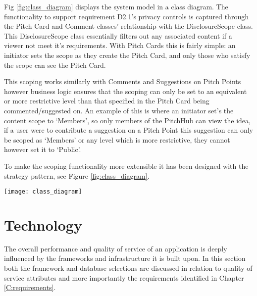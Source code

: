 Fig \ref{fig:class_diagram} displays the system model in a class diagram. The functionality to support requirement D2.1's privacy controls is captured through the Pitch Card and Comment classes' relationship with the DisclosureScope class. This DisclosureScope class essentially filters out any associated content if a viewer not meet it's requirements. With Pitch Cards this is fairly simple: an initiator sets the scope as they create the Pitch Card, and only those who satisfy the scope can see the Pitch Card.

This scoping works similarly with Comments and Suggestions on Pitch Points however business logic ensures that the  scoping can only be set to an equivalent or more restrictive level than that specified in the Pitch Card being commented/suggested on. An example of this is where an initiator set's the content scope to `Members', so only members of the PitchHub can view the idea, if a user were to contribute a suggestion on a Pitch Point this suggestion can only be scoped as `Members' or any level which is more restrictive, they cannot however set it to `Public'. 

To make the scoping functionality more extensible it has been designed with the strategy pattern, see Figure \ref{fig:class_diagram}.
 
\begin{sidewaysfigure}[ht]
    \centering
    \texttt{[image: class\_diagram]}
    \caption{PitchHub's system structure as represented in a class diagram. Of note is the Pitch Card and Comment classes and their relationship to the DisclosureScopes. This relationship describes the Pitch Card and Comment classes ability to scope the visibility of their content. (NB: Some attributes were left out for the sake of brevity e.g. Pitch Cards have an `images' attribute)}
    \label{fig:class_diagram}
\end{sidewaysfigure}

\section{Technology}

The overall performance and quality of service of an application is deeply influenced by the frameworks and infrastructure it is built upon. In this section both the framework and database selections are discussed in relation to quality of service attributes and more importantly the requirements identified in Chapter \ref{C:requirements}.

